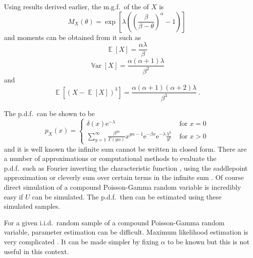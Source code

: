 \documentclass[12pt, a4paper]{memoir}
\DeclareMathOperator{\expectation}{\mathbb{E}}
\DeclareMathOperator{\variance}{\mathbb{V}ar}
\newcommand{\euler}{\mathrm{e}}
\begin{document}
Using results derived earlier, the m.g.f.~of the of $X$ is
\begin{equation}
	M_X(\theta)=\exp\left[\lambda\left(\left(\frac{\beta}{\beta-\theta}\right)^{\alpha}-1\right)\right]
\end{equation}
and moments can be obtained from it such as
\begin{equation}
	\expectation\left[X\right]=\frac{\alpha\lambda}{\beta}
\end{equation}
\begin{equation}
	\variance\left[X\right]=\frac{\alpha(\alpha+1)\lambda}{\beta^2}
	\label{eq:compoundPoisson_variance}
\end{equation}
and
\begin{equation}
	\expectation\left[(X-\expectation[X])^3\right] = \frac{\alpha(\alpha+1)(\alpha+2)\lambda}{\beta^3}
	\ .
\end{equation}

The p.d.f.~can be shown to be
\begin{equation}
	p_X(x) = 
	\begin{cases}
		\delta(x) \euler^{-\lambda} & \text{ for } x=0 \\ 
		\sum_{y=1}^{\infty}\frac{\beta^{y\alpha}}{\Gamma(y\alpha)}x^{y\alpha-1}\euler^{-\beta x}\euler^{-\lambda}\frac{\lambda^y}{y!} & \text{ for } x>0
	\end{cases}
	\label{eq:compoundPoisson_pdf}
\end{equation}
and it is well known the infinite sum cannot be written in closed form. There are a number of approximations or computational methods to evaluate the p.d.f.~such as Fourier inverting the characteristic function \citep{dunn2008evaluation}, using the saddlepoint approximation \citep{daniels1954saddlepoint} or cleverly sum over certain terms in the infinite sum \citep{dunn2005series}. Of course direct simulation of a compound Poisson-Gamma random variable is incredibly easy if $U$ can be simulated. The p.d.f.~then can be estimated using these simulated samples.

For a given i.i.d.~random sample of a compound Poisson-Gamma random variable, parameter estimation can be difficult. Maximum likelihood estimation is very complicated \citep{withers2011compound}. It can be made simpler by fixing $\alpha$ to be known \citep{withers2011compound} but this is not useful in this context.
\end{document}
